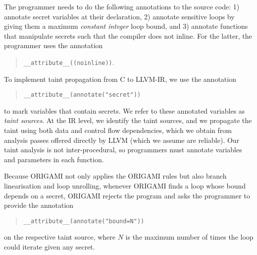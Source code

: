 The programmer needs to do the following annotations to the source code: 1) annotate secret variables at their declaration, 2) annotate sensitive loops by giving them a maximum \emph{constant integer} loop bound, and 3) annotate functions that manipulate secrets such that the compiler does not inline. For the latter, the programmer uses the annotation
\begin{quote}
    \texttt{\_\_attribute\_\_((noinline))}. 
\end{quote}

To implement taint propagation from C to LLVM-IR, we use the annotation 
\begin{quote}
    \texttt{\_\_attribute\_\_(annotate("secret"))} 
\end{quote}
to mark variables that contain secrets. We refer to these annotated variables as \emph{taint sources}. At the IR level, we identify the taint sources, and we propagate the taint using both data and control flow dependencies, which we obtain from analysis passes offered directly by LLVM (which we assume are reliable). Our taint analysis is not inter-procedural, so programmers must annotate variables and parameters in each function.

Because ORIGAMI not only applies the ORIGAMI rules but also branch linearisation and loop unrolling, whenever ORIGAMI finds a loop whose bound depends on a secret, ORIGAMI rejects the program and asks the programmer to provide the annotation 
\begin{quote}
    \texttt{\_\_attribute\_\_(annotate("bound=N"))}    
\end{quote}
 on the respective taint source, where $N$ is the maximum number of times the loop could iterate given any secret. 


%


